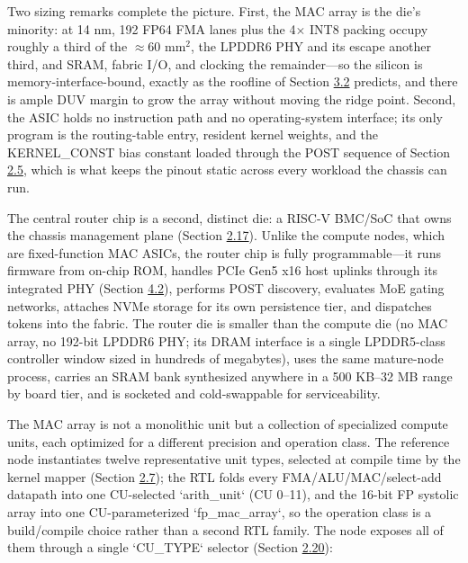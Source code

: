 \documentclass[12pt,onecolumn]{article}
\begin{document}
Two sizing remarks complete the picture. First, the MAC array is the die's minority: at 14 nm, 192 FP64 FMA lanes plus the 4$\times$ INT8 packing occupy roughly a third of the $\approx$60 mm$^2$, the LPDDR6 PHY and its escape another third, and SRAM, fabric I/O, and clocking the remainder---so the silicon is memory-interface-bound, exactly as the roofline of Section \hyperref[sec:3.2]{3.2} predicts, and there is ample DUV margin to grow the array without moving the ridge point. Second, the ASIC holds no instruction path and no operating-system interface; its only program is the routing-table entry, resident kernel weights, and the KERNEL\_CONST bias constant loaded through the POST sequence of Section \hyperref[sec:2.5]{2.5}, which is what keeps the pinout static across every workload the chassis can run.

The central router chip is a second, distinct die: a RISC-V BMC/SoC that owns the chassis management plane (Section \hyperref[sec:2.17]{2.17}). Unlike the compute nodes, which are fixed-function MAC ASICs, the router chip is fully programmable---it runs firmware from on-chip ROM, handles PCIe Gen5 x16 host uplinks through its integrated PHY (Section \hyperref[sec:4.2]{4.2}), performs POST discovery, evaluates MoE gating networks, attaches NVMe storage for its own persistence tier, and dispatches tokens into the fabric. The router die is smaller than the compute die (no MAC array, no 192-bit LPDDR6 PHY; its DRAM interface is a single LPDDR5-class controller window sized in hundreds of megabytes), uses the same mature-node process, carries an SRAM bank synthesized anywhere in a 500 KB--32 MB range by board tier, and is socketed and cold-swappable for serviceability.

The MAC array is not a monolithic unit but a collection of specialized compute units, each optimized for a different precision and operation class. The reference node instantiates twelve representative unit types, selected at compile time by the kernel mapper (Section \hyperref[sec:2.7]{2.7}); the RTL folds every FMA/ALU/MAC/select-add datapath into one CU-selected `arith\_unit` (CU 0--11), and the 16-bit FP systolic array into one CU-parameterized `fp\_mac\_array`, so the operation class is a build/compile choice rather than a second RTL family. The node exposes all of them through a single `CU\_TYPE` selector (Section \hyperref[sec:2.20]{2.20}):
\end{document}
